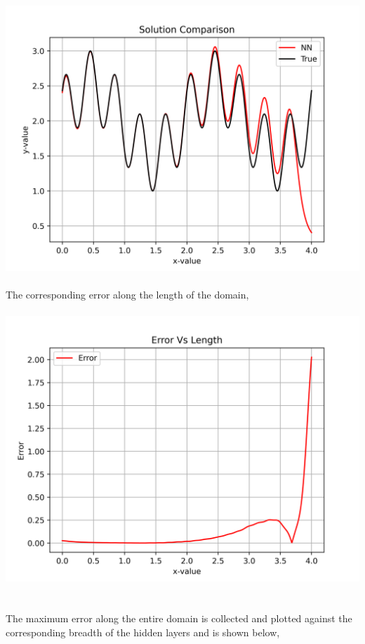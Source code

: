 \documentclass[a4paper, 12pt]{report}
\def\size{0.92}
\begin{document}
\begin{center}
\\~\\\includegraphics[scale=\size]{breadthsol20.png}
\\~\\The corresponding error along the length of the domain,
\\~\\\includegraphics[scale=\size]{breadtherr20.png}
\\~\\~\\The maximum error along the entire domain is collected and plotted against the corresponding breadth of the hidden layers and is shown below,

\end{center}
\end{document}
